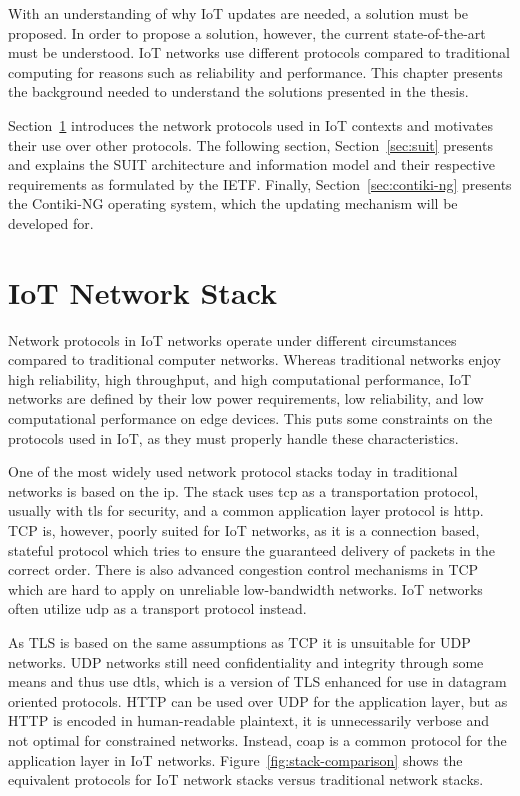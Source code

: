 \documentclass[0-thesis.tex]{subfiles}
\begin{document}
With an understanding of why IoT updates are needed, a solution must be proposed. In order
to propose a solution, however, the current state-of-the-art must be understood. IoT
networks use different protocols compared to traditional computing for reasons such as
reliability and performance. This chapter presents the background needed to understand the
solutions presented in the thesis. 

Section~\ref{sec:network} introduces the network protocols used in IoT contexts and
motivates their use over other protocols. The following section, Section~\ref{sec:suit}
presents and explains the SUIT architecture and information model and their respective
requirements as formulated by the IETF. Finally, Section~\ref{sec:contiki-ng} presents the
Contiki-NG operating system, which the updating mechanism will be developed for.

\section{IoT Network Stack}
\label{sec:network}
Network protocols in IoT networks operate under different circumstances compared to
traditional computer networks. Whereas traditional networks enjoy high reliability, high
throughput, and high computational performance, IoT networks are defined by their low
power requirements, low reliability, and low computational performance on edge devices.
This puts some constraints on the protocols used in IoT, as they must properly handle
these characteristics.

One of the most widely used network protocol stacks today in traditional networks is based
on the \gls{ip}. The stack uses \gls{tcp} as a transportation protocol, usually with
\gls{tls} for security, and a common application layer protocol is \gls{http}. TCP is,
however, poorly suited for IoT networks, as it is a connection based, stateful protocol
which tries to ensure the guaranteed delivery of packets in the correct order. There is
also advanced congestion control mechanisms in TCP which are hard to apply on unreliable
low-bandwidth networks. IoT networks often utilize \gls{udp} as a transport protocol
instead.

As TLS is based on the same assumptions as TCP it is unsuitable for UDP networks. UDP
networks still need confidentiality and integrity through some means and thus use
\gls{dtls}, which is a version of TLS enhanced for use in datagram oriented protocols.
HTTP can be used over UDP for the application layer, but as HTTP is encoded in
human-readable plaintext, it is unnecessarily verbose and not optimal for constrained
networks. Instead, \gls{coap} is a common protocol for the application layer in IoT
networks. Figure~\ref{fig:stack-comparison} shows the equivalent protocols for IoT network
stacks versus traditional network stacks. 
\end{document}
